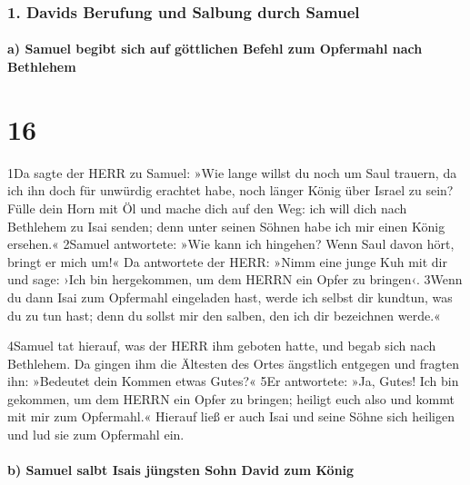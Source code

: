 \hypertarget{davids-berufung-und-salbung-durch-samuel}{%
\subsubsection{1. Davids Berufung und Salbung durch
Samuel}\label{davids-berufung-und-salbung-durch-samuel}}

\hypertarget{a-samuel-begibt-sich-auf-guxf6ttlichen-befehl-zum-opfermahl-nach-bethlehem}{%
\paragraph{a) Samuel begibt sich auf göttlichen Befehl zum Opfermahl
nach
Bethlehem}\label{a-samuel-begibt-sich-auf-guxf6ttlichen-befehl-zum-opfermahl-nach-bethlehem}}

\hypertarget{section-15}{%
\section{16}\label{section-15}}

1Da sagte der HERR zu Samuel: »Wie lange willst du noch um Saul trauern,
da ich ihn doch für unwürdig erachtet habe, noch länger König über
Israel zu sein? Fülle dein Horn mit Öl und mache dich auf den Weg: ich
will dich nach Bethlehem zu Isai senden; denn unter seinen Söhnen habe
ich mir einen König ersehen.« 2Samuel antwortete: »Wie kann ich
hingehen? Wenn Saul davon hört, bringt er mich um!« Da antwortete der
HERR: »Nimm eine junge Kuh mit dir und sage: ›Ich bin hergekommen, um
dem HERRN ein Opfer zu bringen‹. 3Wenn du dann Isai zum Opfermahl
eingeladen hast, werde ich selbst dir kundtun, was du zu tun hast; denn
du sollst mir den salben, den ich dir bezeichnen werde.«

4Samuel tat hierauf, was der HERR ihm geboten hatte, und begab sich nach
Bethlehem. Da gingen ihm die Ältesten des Ortes ängstlich entgegen und
fragten ihn: »Bedeutet dein Kommen etwas Gutes?« 5Er antwortete: »Ja,
Gutes! Ich bin gekommen, um dem HERRN ein Opfer zu bringen; heiligt euch
also und kommt mit mir zum Opfermahl.« Hierauf ließ er auch Isai und
seine Söhne sich heiligen und lud sie zum Opfermahl ein.

\hypertarget{b-samuel-salbt-isais-juxfcngsten-sohn-david-zum-kuxf6nig}{%
\paragraph{b) Samuel salbt Isais jüngsten Sohn David zum
König}\label{b-samuel-salbt-isais-juxfcngsten-sohn-david-zum-kuxf6nig}}

